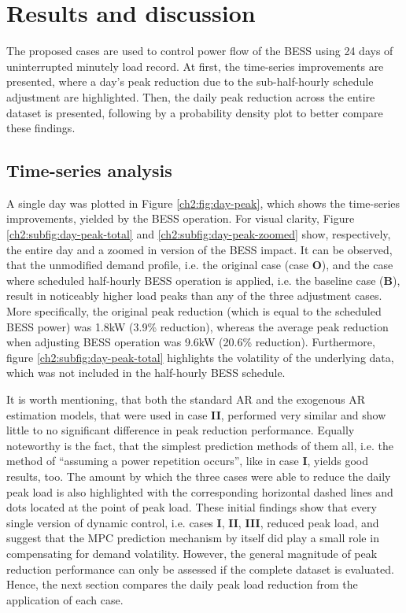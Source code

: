 \section{Results and discussion}
\label{ch2:sec:results}

The proposed cases are used to control power flow of the BESS using 24 days of uninterrupted minutely load record.
At first, the time-series improvements are presented, where a day's peak reduction due to the sub-half-hourly schedule adjustment are highlighted.
Then, the daily peak reduction across the entire dataset is presented, following by a probability density plot to better compare these findings.

\subsection{Time-series analysis}



A single day was plotted in Figure \ref{ch2:fig:day-peak}, which shows the time-series improvements, yielded by the BESS operation.
For visual clarity, Figure \ref{ch2:subfig:day-peak-total} and \ref{ch2:subfig:day-peak-zoomed} show, respectively, the entire day and a zoomed in version of the BESS impact.
It can be observed, that the unmodified demand profile, i.e. the original case (case \textbf{O}), and the case where scheduled half-hourly BESS operation is applied, i.e. the  baseline case (\textbf{B}), result in noticeably higher load peaks than any of the three adjustment cases.
More specifically, the original peak reduction (which is equal to the scheduled BESS power) was 1.8kW (3.9\% reduction), whereas the average peak reduction when adjusting BESS operation was 9.6kW (20.6\% reduction).
Furthermore, figure \ref{ch2:subfig:day-peak-total} highlights the volatility of the underlying data, which was not included in the half-hourly BESS schedule.

It is worth mentioning, that both the standard AR and the exogenous AR estimation models, that were used in case \textbf{II}, performed very similar and show little to no significant difference in peak reduction performance.
Equally noteworthy is the fact, that the simplest prediction methods of them all, i.e. the method of ``assuming a power repetition occurs'', like in case \textbf{I}, yields good results, too.
The amount by which the three cases were able to reduce the daily peak load is also highlighted with the corresponding horizontal dashed lines and dots located at the point of peak load.
These initial findings show that every single version of dynamic control, i.e. cases \textbf{I}, \textbf{II}, \textbf{III}, reduced peak load, and suggest that the MPC prediction mechanism by itself did play a small role in compensating for demand volatility.
However, the general magnitude of peak reduction performance can only be assessed if the complete dataset is evaluated.
Hence, the next section compares the daily peak load reduction from the application of each case.

